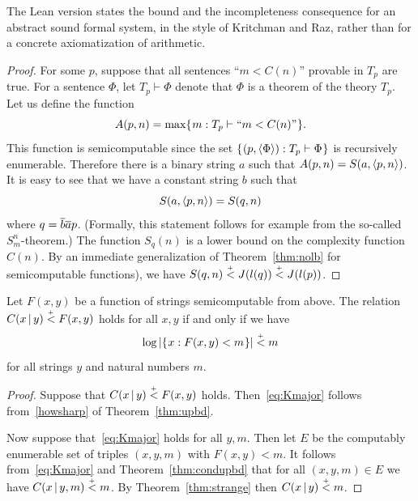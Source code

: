 \begin{formalization}
The Lean version states the bound and the incompleteness consequence for an abstract sound formal system, in the style of Kritchman and Raz, rather than for a concrete axiomatization of arithmetic.
\end{formalization}

\begin{proof}
  \leanok
   For some \( p \), suppose that all sentences ``\( m<C(n) \)''
provable in \( T_{p} \) are true. 
For a sentence \( \Phi \), let \( T_{p} \vdash \Phi \) 
denote that \( \Phi \) is a theorem of the theory \( T_{p} \). 
Let us define the function 
 \[
 A(p,n) = \max\mathopen\{\mskip 1mu m : T_{p} \vdash \text{``}m < C(n)\text{''} \mskip 1mu\mathclose\}.
 \]
 This function is semicomputable since the set
\( \mathopen\{\mskip 1mu(p,\mathopen\langle \Phi\mathclose\rangle): T_{p}\vdash\Phi\mskip 1mu\mathclose\} \) is recursively
enumerable.  
Therefore there is a binary string \( a \) such that
\( A(p,n)=S(a,\mathopen\langle  p,n\mathclose\rangle) \). 
It is easy to see that we have a constant string \( b \) such that 
 \[
   S(a, \mathopen\langle  p,n \mathclose\rangle ) = S(q, n)
 \]
  where \( q = \overline{b} \overline{a} p \). 
(Formally, this statement follows for example from the so-called \( S_{m}^{n} \)-theorem.)  
The function \( S_{q}(n) \) is a
lower bound on the complexity function \( C(n) \). 
By an immediate
generalization of Theorem~\ref{thm:nolb} for semicomputable functions),
we have \( S(q,n) \stackrel{{}_+}{<} J(l(q)) \stackrel{{}_+}{<}  J(l(p)) \).
 \end{proof}

\begin{theorem}[Levin]
  \leanok
    \label{thm:Kmajor}
Let \( F(x,y) \) be a function of strings semicomputable from above. 
The relation \( C(x \,\vert\, y) \stackrel{{}_+}{<} F(x,y) \) holds for all \( x,y \) if and only if 
we have 
 \begin{equation} \label{eq:Kmajor}
  \log |\mathopen\{\mskip 1mu x : F(x,y ) < m \mskip 1mu\mathclose\} | \stackrel{{}_+}{<} m  
 \end{equation}
  for all strings \( y \) and natural numbers \( m \). 
 \end{theorem}

\begin{proof}
  \leanok
 Suppose that \( C(x \,\vert\, y) \stackrel{{}_+}{<} F(x,y) \) holds. 
Then~\eqref{eq:Kmajor} follows from~\ref{howsharp} of Theorem~\ref{thm:upbd}.

Now suppose that~\eqref{eq:Kmajor} holds for all \( y,m \). 
Then let \( E \) be the computably enumerable set of triples \( (x,y,m) \) with \( F(x,y) < m \). 
It follows from~\eqref{eq:Kmajor} and Theorem~\ref{thm:condupbd} that for all
\( (x,y,m)\in E \) we have \( C(x \,\vert\, y,m) \stackrel{{}_+}{<} m \).  
By Theorem~\ref{thm:strange} then \( C(x \,\vert\, y) \stackrel{{}_+}{<} m \). 
 \end{proof}

